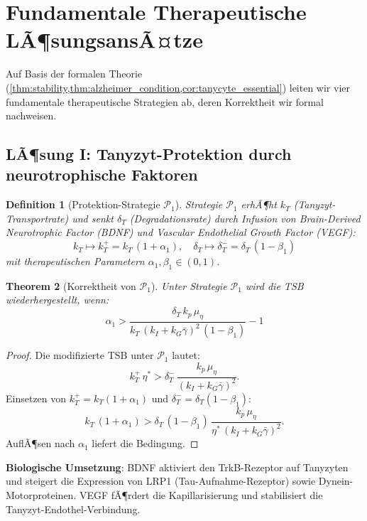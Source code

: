 ﻿\documentclass[12pt,a4paper]{article}
\newtheorem{theorem}{Theorem}[section]
\newtheorem{definition}[theorem]{Definition}
\theoremstyle{definition}
\begin{document}
	\section{Fundamentale Therapeutische LÃ¶sungsansÃ¤tze}
	
	Auf Basis der formalen Theorie (\cref{thm:stability,thm:alzheimer_condition,cor:tanycyte_essential}) leiten wir vier fundamentale therapeutische Strategien ab, deren Korrektheit wir formal nachweisen.
	
	\subsection{LÃ¶sung I: Tanyzyt-Protektion durch neurotrophische Faktoren}
	
	\begin{definition}[Protektion-Strategie $\mathcal{P}_1$]
		Strategie $\mathcal{P}_1$ erhÃ¶ht $k_T$ (Tanyzyt-Transportrate) und senkt $\delta_T$ (Degradationsrate) durch Infusion von Brain-Derived Neurotrophic Factor (BDNF) und Vascular Endothelial Growth Factor (VEGF):
		\[
		k_T \mapsto k_T^+ = k_T\,(1+\alpha_1), \quad \delta_T \mapsto \delta_T^- = \delta_T\,(1-\beta_1)
		\]
		mit therapeutischen Parametern $\alpha_1, \beta_1 \in (0,1)$.
	\end{definition}
	
	\begin{theorem}[Korrektheit von $\mathcal{P}_1$]
		\label{thm:p1_korrektheit}
		Unter Strategie $\mathcal{P}_1$ wird die TSB wiederhergestellt, wenn:
		\[
		\alpha_1 > \frac{\delta_T\,k_p\,\mu_\eta}{k_T\,(k_I + k_G\bar{\gamma})^2\,(1-\beta_1)} - 1
		\]
	\end{theorem}
	
	\begin{proof}
		Die modifizierte TSB unter $\mathcal{P}_1$ lautet:
		\[
		k_T^+\,\eta^* > \delta_T^-\,\frac{k_p\,\mu_\eta}{(k_I + k_G\bar{\gamma})^2}.
		\]
		Einsetzen von $k_T^+ = k_T(1+\alpha_1)$ und $\delta_T^- = \delta_T(1-\beta_1)$:
		\[
		k_T\,(1+\alpha_1) > \delta_T\,(1-\beta_1)\,\frac{k_p\,\mu_\eta}{\eta^*\,(k_I + k_G\bar{\gamma})^2}.
		\]
		AuflÃ¶sen nach $\alpha_1$ liefert die Bedingung.
	\end{proof}
	
	\textbf{Biologische Umsetzung}: BDNF aktiviert den TrkB-Rezeptor auf Tanyzyten und steigert die Expression von LRP1 (Tau-Aufnahme-Rezeptor) sowie Dynein-Motorproteinen. VEGF fÃ¶rdert die Kapillarisierung und stabilisiert die Tanyzyt-Endothel-Verbindung.
	
\end{document}
